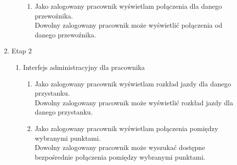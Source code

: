 \documentclass[10pt,a4paper]{article}
\begin{document}
\begin{enumerate}
\begin{enumerate}[label*=\arabic*.]
\begin{enumerate}[label*=\arabic*.]
	    	\item Jako zalogowany pracownik wyświetlam połączenia dla danego przewoźnika. \\
			    Dowolny zalogowany pracownik może wyświetlić połączenia od danego przewoźnika.
		\end{enumerate}
	\end{enumerate}
	\item Etap 2
	\begin{enumerate}[label*=\arabic*.]
		\item Interfejs administracyjny dla pracownika
		\begin{enumerate}[label*=\arabic*.]
			\mdseries
		 	\item Jako zalogowany pracownik wyświetlam rozkład jazdy dla danego przystanku. \\
			    Dowolny zalogowany pracownik może wyświetlić rozkład jazdy dla danego przystanku.
		 	\item Jako zalogowany pracownik wyświetlam połączenia pomiędzy wybranymi punktami. \\
			    Dowolny zalogowany pracownik może wyszukać dostępne bezpośrednie połączenia pomiędzy wybranymi punktami. \\
		\end{enumerate}
	\end{enumerate}
\end{enumerate}
\end{document}
